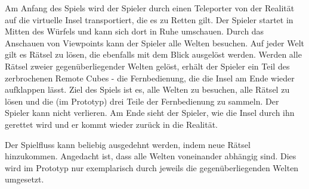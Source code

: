 
Am Anfang des Spiels wird der Spieler durch einen Teleporter von der Realität auf die virtuelle Insel transportiert, die es zu Retten gilt. Der Spieler startet in Mitten des Würfels und kann sich dort in Ruhe umschauen. Durch das Anschauen von Viewpoints kann der Spieler alle Welten besuchen. Auf jeder Welt gilt es Rätsel zu lösen, die ebenfalls mit dem Blick ausgelöst werden. Werden alle Rätsel zweier gegenüberliegender Welten gelöst, erhält der Spieler ein Teil des zerbrochenen Remote Cubes - die Fernbedienung, die die Insel am Ende wieder aufklappen lässt.
Ziel des Spiels ist es, alle Welten zu besuchen, alle Rätsel zu lösen und die (im Prototyp) drei Teile der Fernbedienung zu sammeln. 
Der Spieler kann nicht verlieren. Am Ende sieht der Spieler, wie die Insel durch ihn gerettet wird und er kommt wieder zurück in die Realität.

Der Spielfluss kann beliebig ausgedehnt werden, indem neue Rätsel hinzukommen. Angedacht ist, dass alle Welten voneinander abhängig sind. Dies wird im Prototyp nur exemplarisch durch jeweils die gegenüberliegenden Welten umgesetzt.
